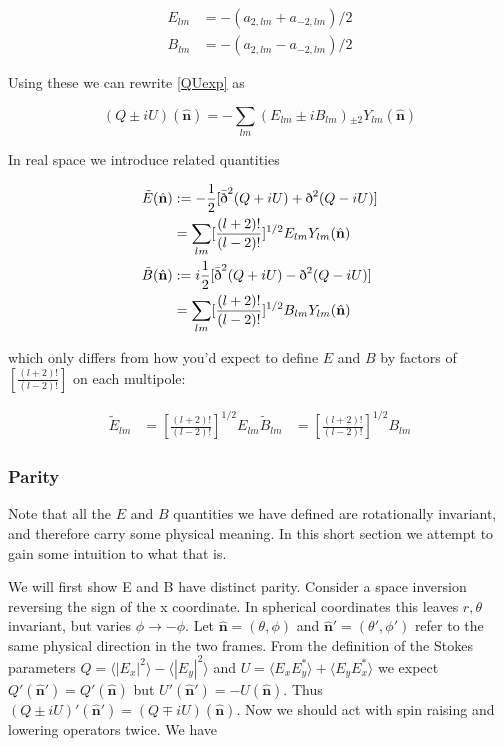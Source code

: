 \documentclass[a4paper,11pt]{article}
\renewcommand{\v}[1]{\mathbf{#1}}
\newcommand{\half}{\frac{1}{2}}
\newcommand{\unit}[1]{\hat{\v{#1}}}
\newcommand{\sr}{\text{\normalfont\dh}}
\renewcommand{\sl}{\bar{\text{\normalfont\dh}}}
\newcommand{\ltwo}{[\frac{(l+2)!}{(l-2)!}]}
\begin{document}
\begin{align} 
E_{lm} &= -(a_{2,lm} + a_{-2,lm})/2\\
B_{lm} &= -(a_{2,lm} - a_{-2,lm})/2
\end{align}

Using these we can rewrite \ref{QUexp} as 

\begin{equation}
(Q\pm iU)(\unit{n}) = -\sum_{lm} (E_{lm} \pm i B_{lm}) {}_{\pm2}Y_{lm}(\unit{n})
\label{QUEB}
\end{equation}

In real space we introduce related quantities 

\begin{align}
\tilde{E}(\unit{n}) &:= -\half[\sl^2(Q+iU) + \sr^2(Q-iU)]\\
&= \sum_{lm} \ltwo^{1/2}E_{lm}Y_{lm}(\unit{n})\\
\tilde{B}(\unit{n}) &:= i\half[\sl^2(Q+iU) - \sr^2(Q-iU)]\\
&= \sum_{lm} \ltwo^{1/2}B_{lm}Y_{lm}(\unit{n})
\label{EBmodes}
\end{align}

which only differs from how you'd expect to define $E$ and $B$ by factors of $\ltwo$ on each multipole: 

\begin{align}
\tilde{E}_{lm}&=\ltwo^{1/2}E_{lm}
\tilde{B}_{lm}&=\ltwo^{1/2}B_{lm}
\label{EBtwiddle}
\end{align}

\subsubsection{Parity}

Note that all the $E$ and $B$ quantities we have defined are rotationally invariant, and therefore carry some physical meaning. In this short section we attempt to gain some intuition to what that is.

We will first show E and B have distinct parity. Consider a space inversion reversing the sign of the x coordinate. In spherical coordinates this leaves $r, \theta$ invariant, but varies $\phi \rightarrow -\phi$.  Let $\unit{n}=(\theta, \phi)$ and $\unit{n}'=(\theta', \phi')$ refer to the same physical direction in the two frames. From the definition of the Stokes parameters $Q=\langle |E_x|^2 \rangle - \langle |E_y|^2 \rangle$ and $U = \langle E_xE_y^* \rangle + \langle E_yE_x^* \rangle$ we expect $Q'(\unit{n}') = Q'(\unit{n})$ but $U'(\unit{n}') = -U(\unit{n})$. Thus $(Q\pm iU)'(\unit{n}') = (Q\mp iU)(\unit{n})$. Now we should act with spin raising and lowering operators twice. We have
\end{document}
